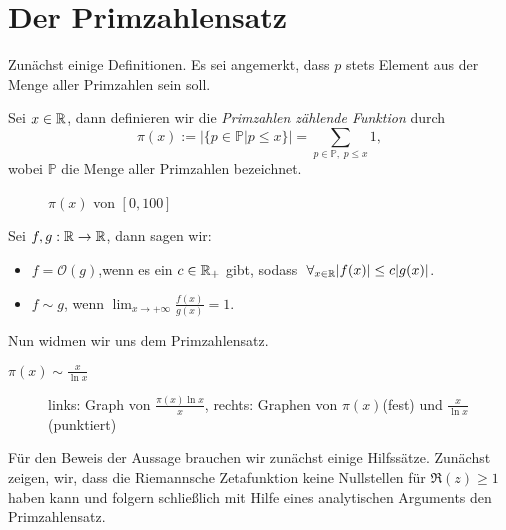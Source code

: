 \documentclass{mywork}
\begin{document}
\section*{Der Primzahlensatz}
Zunächst einige Definitionen. Es sei angemerkt, dass $ p $ stets Element aus der Menge aller Primzahlen sein soll.

\begin{df}
Sei $ x\in \mathbb{R} $, dann definieren wir die \emph{Primzahlen zählende Funktion} durch
\[
\pi(x):=\Big|\{p\in \mathbb P| p \le x\}\Big|=\sum_{p \in \mathbb P,\; p \le x} 1,
\]
wobei $ \mathbb P $ die Menge aller Primzahlen bezeichnet.
\end{df} 
\begin{figure}[H]
	\centering
	\newlength\figureheight 
	\newlength\figurewidth 
	\setlength\figureheight{6cm} 
	\setlength\figurewidth{10cm}
	
	\caption{$ \pi(x) $ von $ [0,100] $}
	\label{fig:pi}
\end{figure}

\begin{df}
Sei $ f,g: \mathbb{R}\to \mathbb{R} $, dann sagen wir:
\begin{itemize}
\item $ f=\mathcal O(g)$,wenn es ein $ c\in \mathbb{R}_+ $ gibt, sodass $ \forall_{x\in \R} |f(x)|\le c|g(x)| $.
\item $ f\sim g $, wenn $ \lim_{x\to +\infty} \frac{f(x)}{g(x)}=1 $.
\end{itemize}
\end{df}

Nun widmen wir uns dem Primzahlensatz.
\begin{st}[Primzahlensatz]
$ \pi(x)\sim \frac{x}{\ln x} $
\end{st}
\begin{figure}[H]
	\centering
	\setlength\figureheight{3cm} 
	\setlength\figurewidth{5cm}
	\begin{minipage}{5cm}\end{minipage} \hspace{3cm} \begin{minipage}{5cm} \end{minipage}
	\caption{links: Graph von $\frac{\pi(x) \ln x}x$, rechts: Graphen von $ \pi(x) $(fest) und $ \frac{x}{\ln x} $(punktiert)}
	\label{fig:quotient}
\end{figure}

Für den Beweis der Aussage brauchen wir zunächst einige Hilfssätze. Zunächst zeigen, wir, dass die Riemannsche Zetafunktion keine Nullstellen für $ \Re(z)\ge 1 $ haben kann und folgern schließlich mit Hilfe eines analytischen Arguments den Primzahlensatz.
\end{document}
